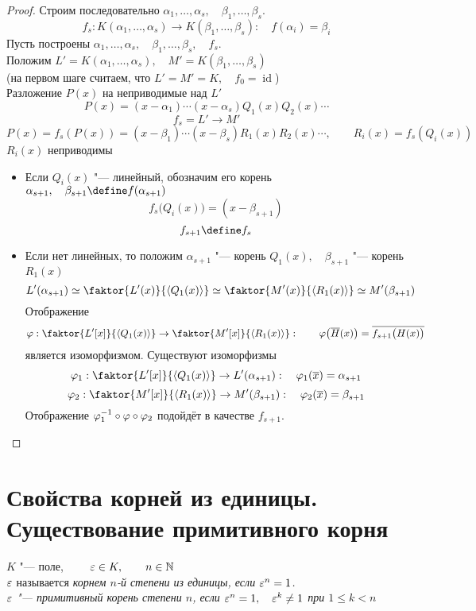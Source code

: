 \begin{proof}
	Строим последовательно $ \alpha_1, \dots, \alpha_s, \quad \beta_1, \dots, \beta_s $.
	$$ f_s : K(\alpha_1, \dots, \alpha_s) \to K(\beta_1, \dots, \beta_s) : \quad f(\alpha_i) = \beta_i $$
	Пусть построены $ \alpha_1, \dots, \alpha_s, \quad \beta_1, \dots, \beta_s, \quad f_s $. \\
	Положим $ L' = K(\alpha_1, \dots, \alpha_s), \quad M' = K(\beta_1, \dots, \beta_s) $ \\
	(на первом шаге считаем, что $ L' = M' = K, \quad f_0 = \operatorname{id} $) \\
	Разложение $ P(x) $ на неприводимые над $ L' $
	$$ P(x) = (x - \alpha_1) \cdots (x - \alpha_s) Q_1(x)Q_2(x) \cdots $$
	$$ f_s = L' \to M' $$
	$$ P(x) = f_s(P(x)) = (x - \beta_1) \cdots (x - \beta_s)R_1(x)R_2(x) \cdots, \qquad R_i(x) = f_s(Q_i(x)) $$
	$ R_i(x) $ неприводимы
	\begin{itemize}
		\item Если $ Q_i(x) $ "--- линейный, обозначим его корень $ \alpha_{s + 1}, \quad \beta_{s + 1} \define f(\alpha_{s + 1}) $
		$$ f_s \big( Q_i(x) \big) = (x - \beta_{s + 1}) $$
		$$ f_{s + 1} \define f_s $$
		\item Если нет линейных, то положим $ \alpha_{s + 1} $ "--- корень $ Q_1(x), \quad \beta_{s + 1} $ "--- корень $ R_1(x) $
		$$ L'(\alpha_{s + 1}) \simeq \faktor{L'(x)}{\braket{Q_1(x)}} \simeq \faktor{M'(x)}{\braket{R_1(x)}} \simeq M'(\beta_{s + 1}) $$
		Отображение
		$$ \vphi : \faktor{L'[x]}{\braket{Q_1(x)}} \to \faktor{M'[x]}{\braket{R_1(x)}} : \qquad \vphi \big( \ol H(x) \big) = \ol{f_{s + 1} \big( H(x) \big)} $$
		является изоморфизмом. Существуют изоморфизмы
		$$ \vphi_1 : \faktor{L'[x]}{\braket{Q_1(x)}} \to L'(\alpha_{s + 1}) : \quad \vphi_1(\ol x) = \alpha_{s + 1} $$
		$$ \vphi_2 : \faktor{M'[x]}{\braket{R_1(x)}} \to M'(\beta_{s + 1}) : \quad \vphi_2(\ol x) = \beta_{s + 1} $$
		Отображение $ \varphi_1^{-1} \circ \varphi \circ \varphi_2 $ подойдёт в качестве $ f_{s + 1} $.
	\end{itemize}
\end{proof}

\section{Свойства корней из единицы. Существование примитивного корня}

\begin{definition}
	$ K $ "--- поле, $ \qquad \varepsilon \in K, \qquad n \in \mathbb{N} $ \\
	$ \varepsilon $ называется \it{корнем} $ n $-й степени \it{из единицы}, если $ \varepsilon^n = 1 $. \\
	$ \varepsilon $ "--- \it{примитивный} корень степени $ n $, если $ \varepsilon^n = 1, \quad \varepsilon^k \ne 1 $ при $ 1 \le k < n $
\end{definition}

